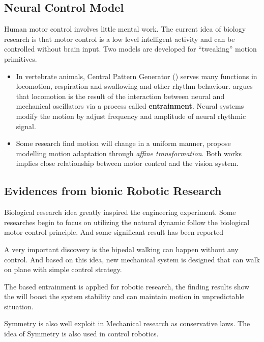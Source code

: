 \subsection{Neural Control Model}
Human motor control involves little mental work.
The current idea of biology research is that motor control is a low level intelligent activity and can be controlled  without brain input. 
Two models are developed for ``tweaking'' motion primitives.
\begin{itemize}
\item
In vertebrate animals,  Central Pattern Generator (\cpg) serves many functions in locomotion, respiration and swallowing and other rhythm behaviour.
\citet{Cohen1988a} argues that locomotion is the result of the interaction between neural and mechanical oscillators via a process called \textbf{entrainment}.
Neural systems modify the motion by adjust frequency and amplitude of neural rhythmic signal.



\item
Some research find motion will change in a uniform manner\citep{Viviani1992},\citep{flash2007affine} propose modelling motion adaptation through \emph{affine transformation}.
Both works implies close relationship between motor control and the vision system.
\end{itemize}









\subsection{ Evidences from bionic Robotic Research}
Biological research idea greatly inspired the engineering experiment.
Some researches begin to focus on utilizing the natural dynamic follow the biological motor control principle.
And some significant result has been reported
\begin{itemize}
A very important discovery is the bipedal walking can happen without any control\citep{McGeer1990}.  
And based on this idea, new mechanical system is designed that can walk on plane with simple control strategy\citep{Collins2005}.

The \cpg based entrainment is applied for robotic research\citep{Williamson1999a}, the finding results show the \cpg will boost the system stability and can maintain motion in unpredictable situation.

Symmetry is also well exploit in Mechanical research as conservative laws.
The idea of Symmetry is also used in control robotics\citep{spong2005controlled}.
\end{itemize}

